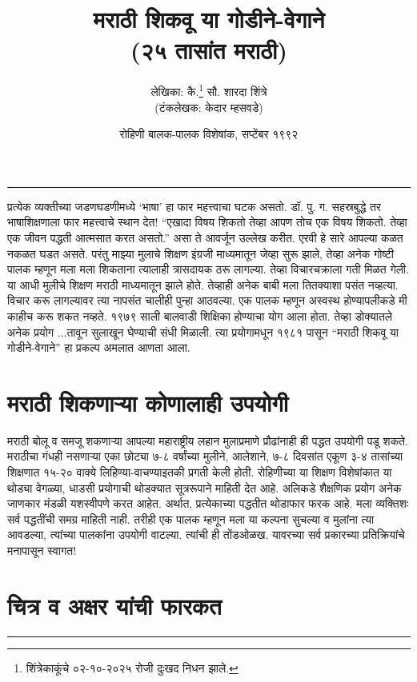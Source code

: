\documentclass[17pt]{extarticle}  %
\begin{document}
\title{मराठी शिकवू या गोडीने-वेगाने\\ \large{(२५ तासांत मराठी)}}
\author{लेखिका: कै.\footnote{शिंत्रेकाकूंचे ०२-१०-२०२५ रोजी दुःखद निधन झाले.} सौ. शारदा शिंत्रे\\ \tiny{(टंकलेखक: केदार म्हसवडे)}}
\date{रोहिणी बालक-पालक विशेषांक, सप्टेंबर १९९२}
\maketitle
\vspace{5mm}
\hrule
प्रत्येक व्यक्तीच्या जडणघडणीमध्ये \enquote*{भाषा} हा फार महत्त्वाचा घटक असतो. डॉ. पु. ग. सहस्रबुद्धे तर भाषाशिक्षणाला फार महत्त्वाचे स्थान देत! \enquote{एखादा विषय शिकतो तेव्हा आपण तोच एक विषय शिकतो. तेव्हा एक जीवन पद्धती आत्मसात करत असतो.} असा ते आवर्जून उल्लेख करीत. एरवी हे सारे आपल्या कळत नकळत घडत असते. परंतु माझ्या मुलाचे शिक्षण इंग्रजी माध्यमातून जेव्हा सुरू झाले, तेव्हा अनेक गोष्टी पालक म्हणून मला मला शिकताना त्यालाही त्रासदायक ठरू लागल्या. तेव्हा विचारचक्राला गती मिळत गेली. या आधी मुलीचे शिक्षण मराठी माध्यमातून झाले होते. तेव्हाही अनेक बाबी मला तितक्याशा पसंत नव्हत्या. विचार करू लागल्यावर त्या नापसंत चालीही पुन्हा आठवल्या. एक पालक म्हणून अस्वस्थ होण्यापलीकडे मी काहीच करू शकत नव्हते. १९७९ साली बालवाडी शिक्षिका होण्याचा योग आला होता. तेव्हा डोक्यातले अनेक प्रयोग ...तावून सुलाखून घेण्याची संधी मिळाली. त्या प्रयोगामधून १९८१ पासून \enquote{मराठी शिकवू या गोडीने-वेगाने} हा प्रकल्प अमलात आणता आला.
\section*{मराठी शिकणाऱ्या कोणालाही उपयोगी}
मराठी बोलू व समजू शकणाऱ्या आपल्या महाराष्ट्रीय लहान मुलाप्रमाणे प्रौढांनाही ही पद्धत उपयोगी पडू शकते. मराठीचा गंधही नसणाऱ्या एका छोट्या ७-८  वर्षांच्या मुलीने, आलेशाने, ७-८ दिवसांत एकूण ३-४ तासांच्या शिक्षणात १५-२० वाक्ये लिहिण्या-वाचण्याइतकी प्रगती केली होती. रोहिणीच्या या शिक्षण विशेषांकात या थोड्या वेगळ्या, धाडसी प्रयोगाची थोडक्यात सूत्ररूपाने माहिती देत आहे. अलिकडे शैक्षणिक प्रयोग अनेक जाणकार मंडळी यशस्वीपणे करत आहेत. अर्थात, प्रत्येकाच्या पद्धतीत थोडाफार फरक आहे. मला व्यक्तिशः सर्व पद्धतींची समग्र माहिती नाही. तरीही एक पालक म्हणून मला या कल्पना सुचल्या व मुलांना त्या आवडल्या, त्यांच्या पालकांना उपयोगी वाटल्या. त्यांची ही तोंडओळख. यावरच्या सर्व प्रकारच्या प्रतिक्रियांचे मनापासून स्वागत!	
\section*{चित्र व अक्षर यांची फारकत}

\vspace{5mm}
\hrule
\end{document}
